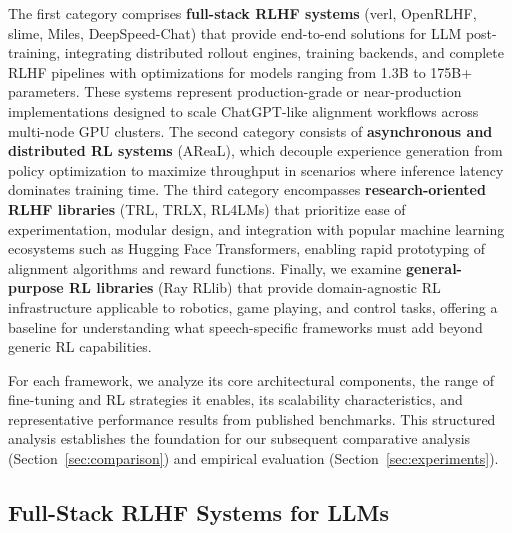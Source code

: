 \documentclass[conference]{IEEEtran}
\begin{document}
The first category comprises \textbf{full-stack RLHF systems} (verl, OpenRLHF, slime, Miles, DeepSpeed-Chat) that provide end-to-end solutions for LLM post-training, integrating distributed rollout engines, training backends, and complete RLHF pipelines with optimizations for models ranging from 1.3B to 175B+ parameters. These systems represent production-grade or near-production implementations designed to scale ChatGPT-like alignment workflows across multi-node GPU clusters. The second category consists of \textbf{asynchronous and distributed RL systems} (AReaL), which decouple experience generation from policy optimization to maximize throughput in scenarios where inference latency dominates training time. The third category encompasses \textbf{research-oriented RLHF libraries} (TRL, TRLX, RL4LMs) that prioritize ease of experimentation, modular design, and integration with popular machine learning ecosystems such as Hugging Face Transformers, enabling rapid prototyping of alignment algorithms and reward functions. Finally, we examine \textbf{general-purpose RL libraries} (Ray RLlib) that provide domain-agnostic RL infrastructure applicable to robotics, game playing, and control tasks, offering a baseline for understanding what speech-specific frameworks must add beyond generic RL capabilities.

For each framework, we analyze its core architectural components, the range of fine-tuning and RL strategies it enables, its scalability characteristics, and representative performance results from published benchmarks. This structured analysis establishes the foundation for our subsequent comparative analysis (Section~\ref{sec:comparison}) and empirical evaluation (Section~\ref{sec:experiments}).

\subsection{Full-Stack RLHF Systems for LLMs}
\end{document}
